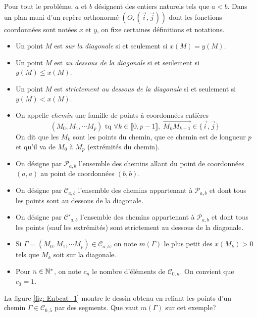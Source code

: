 Pour tout le problème, $a$ et $b$ désignent des entiers naturels tels que $a < b$. 
Dans un plan muni d'un repère orthonormé $(O,(\overrightarrow i , \overrightarrow j))$ dont les fonctions coordonnées sont notées $x$ et $y$, on fixe certaines définitions et notations.
\begin{itemize}
 \item Un point $M$ est \emph{sur la diagonale} si et seulement si $x(M) = y(M)$.
 \item Un point $M$ est \emph{au dessous de la diagonale} si et seulement si $y(M) \leq x(M)$.
 \item Un point $M$ est \emph{strictement au dessous de la diagonale} si et seulement si $y(M) < x(M)$.
 \item On appelle \emph{chemin} une famille de points à coordonnées entières 
\begin{displaymath}
 (M_0,M_1,\cdots M_p) \text{ tq } \forall k\in \llbracket 0, p-1 \rrbracket,\; 
\overrightarrow{M_kM_{k+1}}\in \{\overrightarrow i , \overrightarrow j\}
\end{displaymath}
On dit que les $M_k$ sont les points du chemin, que ce chemin est de longueur $p$ et qu'il va de $M_0$ à $M_p$ (extrémités du chemin).
 \item On désigne par $\mathcal{P}_{a,b}$ l'ensemble des chemins allant du point de coordonnées $(a,a)$ au point de coordonnées  $(b,b)$.
 \item On désigne par $\mathcal{C}_{a,b}$ l'ensemble des chemins appartenant à $\mathcal{P}_{a,b}$ et dont tous les points sont au dessous de la diagonale.
 \item On désigne par $\mathcal{C}'_{a,b}$ l'ensemble des chemins appartenant à $\mathcal{P}_{a,b}$ et dont tous les points (sauf les extrémités) sont strictement au dessous de la diagonale.
 \item Si $\Gamma = (M_0,M_1,\cdots M_p)\in \mathcal{C}_{a,b}$, on note $m(\Gamma)$ le plus petit des $x(M_k)>0$ tels que $M_k$ soit sur la diagonale.
 \item Pour $n\in \mathbb{N}^*$, on note $c_n$ le nombre d'éléments de $\mathcal{C}_{0,n}$. On convient que $c_0=1$.
\end{itemize}
La figure \ref{fig: Enbcat_1} montre le dessin obtenu en reliant les points d'un chemin $\Gamma \in \mathcal{C}_{0,5}$ par des segments. Que vaut $m(\Gamma)$ sur cet exemple?
